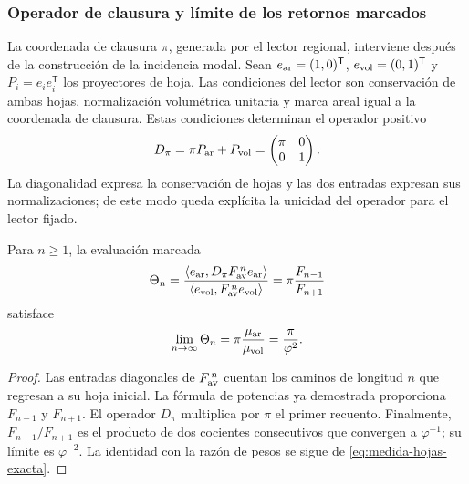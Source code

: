 \subsubsection{Operador de clausura y límite de los retornos marcados}
\label{sec:operador-retorno-marcado}

La coordenada de clausura \(\pi\), generada por el lector regional,
interviene después de la construcción de la incidencia modal. Sean
\(e_{\rm ar}=(1,0)^{\mathsf T}\),
\(e_{\rm vol}=(0,1)^{\mathsf T}\) y
\(P_i=e_ie_i^{\mathsf T}\) los proyectores de hoja. Las condiciones
del lector son conservación de ambas hojas, normalización volumétrica
unitaria y marca areal igual a la coordenada de clausura. Estas condiciones
determinan el operador positivo
\begin{equation}
 D_\pi=\pi P_{\rm ar}+P_{\rm vol}
       =\begin{pmatrix}\pi&0\\0&1\end{pmatrix}.
 \label{eq:operador-marca-pi}
\end{equation}
La diagonalidad expresa la conservación de hojas y las dos entradas
expresan sus normalizaciones; de este modo queda explícita la unicidad
del operador para el lector fijado.

\begin{proposition}
Para \(n\geq1\), la evaluación marcada
\begin{equation}
 \Theta_n=
 \frac{\langle e_{\rm ar},D_\pi F_{\rm av}^{\,n}e_{\rm ar}\rangle}
 {\langle e_{\rm vol},F_{\rm av}^{\,n}e_{\rm vol}\rangle}
 =\pi\frac{F_{n-1}}{F_{n+1}}
 \label{eq:retorno-marcado-finito}
\end{equation}
satisface
\begin{equation}
 \lim_{n\to\infty}\Theta_n
 =\pi\frac{\mu_{\rm ar}}{\mu_{\rm vol}}
 =\frac{\pi}{\varphi^2}.
 \label{eq:retorno-marcado-limite}
\end{equation}
\end{proposition}
\begin{proof}
Las entradas diagonales de \(F_{\rm av}^{\,n}\) cuentan los caminos
de longitud \(n\) que regresan a su hoja inicial. La fórmula de potencias
ya demostrada proporciona \(F_{n-1}\) y \(F_{n+1}\). El operador
\(D_\pi\) multiplica por \(\pi\) el primer recuento. Finalmente,
\(F_{n-1}/F_{n+1}\) es el producto de dos cocientes consecutivos
que convergen a \(\varphi^{-1}\); su límite es
\(\varphi^{-2}\). La identidad con la razón de pesos se sigue de
\eqref{eq:medida-hojas-exacta}.
\end{proof}

